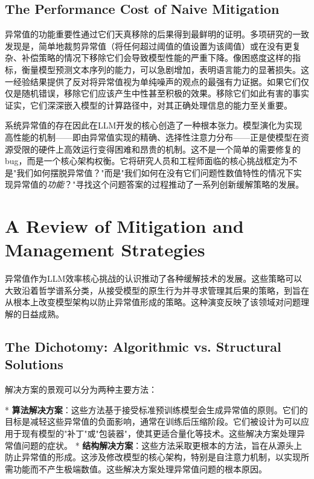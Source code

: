 \documentclass{article}
\begin{document}
\subsection{The Performance Cost of Naive Mitigation}

异常值的功能重要性通过它们天真移除的后果得到最鲜明的证明。多项研究的一致发现是，简单地裁剪异常值（将任何超过阈值的值设置为该阈值）或在没有更复杂、补偿策略的情况下移除它们会导致模型性能的严重下降。像困惑度这样的指标，衡量模型预测文本序列的能力，可以急剧增加，表明语言能力的显著损失。这一经验结果提供了反对将异常值视为单纯噪声的观点的最强有力证据。如果它们仅仅是随机错误，移除它们应该产生中性甚至积极的效果。移除它们如此有害的事实证实，它们深深嵌入模型的计算路径中，对其正确处理信息的能力至关重要。

系统异常值的存在因此在LLM开发的核心创造了一种根本张力。模型演化为实现高性能的机制——即由异常值实现的精确、选择性注意力分布——正是使模型在资源受限的硬件上高效运行变得困难和昂贵的机制。这不是一个简单的需要修复的bug，而是一个核心架构权衡。它将研究人员和工程师面临的核心挑战框定为不是"我们如何摆脱异常值？"而是"我们如何在没有它们问题性数值特性的情况下实现异常值的\emph{功能}？"寻找这个问题答案的过程推动了一系列创新缓解策略的发展。

\section{A Review of Mitigation and Management Strategies}

异常值作为LLM效率核心挑战的认识推动了各种缓解技术的发展。这些策略可以大致沿着哲学谱系分类，从接受模型的原生行为并寻求管理其后果的策略，到旨在从根本上改变模型架构以防止异常值形成的策略。这种演变反映了该领域对问题理解的日益成熟。

\subsection{The Dichotomy: Algorithmic vs. Structural Solutions}

解决方案的景观可以分为两种主要方法：

* \textbf{算法解决方案}：这些方法基于接受标准预训练模型会生成异常值的原则。它们的目标是减轻这些异常值的负面影响，通常在训练后压缩阶段。它们被设计为可以应用于现有模型的"补丁"或"包装器"，使其更适合量化等技术。这些解决方案处理异常值问题的症状。
* \textbf{结构解决方案}：这些方法采取更根本的方法，旨在从源头上防止异常值的形成。这涉及修改模型的核心架构，特别是自注意力机制，以实现所需功能而不产生极端数值。这些解决方案处理异常值问题的根本原因。
\end{document}
